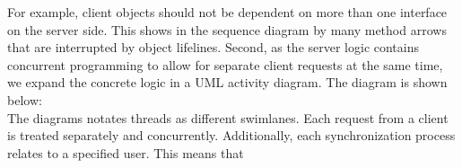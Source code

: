 For example, client objects should not be dependent on more than one interface on the server side. This shows in the sequence diagram by many method arrows that are interrupted by object lifelines. Second, as the server logic contains concurrent programming to allow for separate client requests at the same time, we expand the concrete logic in a UML activity diagram. The diagram is shown below:\\
\newline
The diagrams notates threads as different swimlanes. Each request from a client is treated separately and concurrently. Additionally, each synchronization process relates to a specified user. This means that 
\newpage